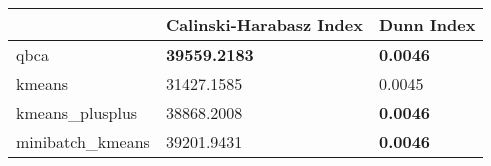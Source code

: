 \begin{table}[htbp]
\centering
\begin{tabular}{lll}
\toprule
 & Calinski-Harabasz Index & Dunn Index \\
\midrule
qbca & \textbf{39559.2183} & \textbf{0.0046} \\
kmeans & 31427.1585 & 0.0045 \\
kmeans_plusplus & 38868.2008 & \textbf{0.0046} \\
minibatch_kmeans & 39201.9431 & \textbf{0.0046} \\
\bottomrule
\end{tabular}
\end{table}
